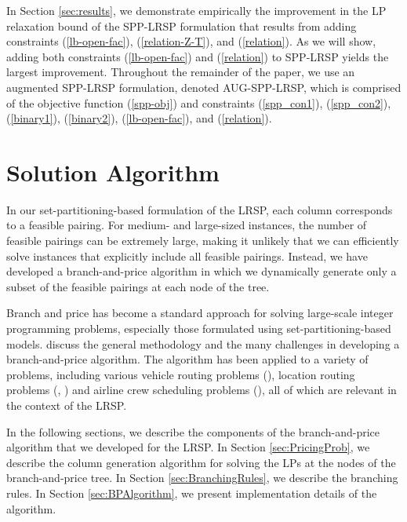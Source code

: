 \documentclass[11pt]{article}
\begin{document}

In Section \ref{sec:results}, we demonstrate empirically the improvement in the LP relaxation 
bound of the SPP-LRSP formulation that results from adding constraints (\ref{lb-open-fac}), 
(\ref{relation-Z-T}), and (\ref{relation}). 
As we will show, adding both constraints (\ref{lb-open-fac}) and (\ref{relation}) to 
SPP-LRSP yields the largest improvement.  Throughout the remainder of the paper, we use
an augmented SPP-LRSP formulation, denoted AUG-SPP-LRSP, which is comprised of the 
objective function (\ref{spp-obj}) and constraints (\ref{spp_con1}), 
(\ref{spp_con2}), (\ref{binary1}), (\ref{binary2}), (\ref{lb-open-fac}), and (\ref{relation}). 

\section{Solution Algorithm} 
\label{sec:algorithm}
In our set-partitioning-based formulation of the LRSP, each column corresponds to a feasible
pairing.  For medium- and large-sized instances, the number of feasible pairings can be 
extremely large, making it unlikely that we can efficiently solve instances that 
explicitly include all feasible pairings. Instead, we have developed a branch-and-price
algorithm in which we dynamically generate only a subset of the feasible pairings
at each node of the tree.

Branch and price has become a standard approach for solving large-scale integer programming
problems, especially those formulated using set-partitioning-based models. 
\citet{Barnhart} discuss the general methodology and the many  
challenges in developing a branch-and-price algorithm. 
The algorithm has been applied to a variety of problems, including various vehicle routing problems 
(\citet{Fukusawa}),
location routing problems (\citet{Berger07}, \citet{Akca3}) and  
airline crew scheduling problems (\citet{Vance}), all of which are relevant in the context of the LRSP.

In the following sections, we describe the components of the branch-and-price algorithm
that we developed for the LRSP.
In Section \ref{sec:PricingProb}, we describe the column generation algorithm for solving
the LPs at the nodes of the branch-and-price tree. In Section \ref{sec:BranchingRules}, 
we describe the branching rules. In Section \ref{sec:BPAlgorithm}, 
we present implementation details of the algorithm. 
\end{document}
